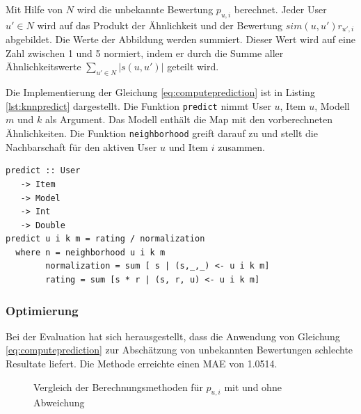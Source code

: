 \documentclass[a4paper, 12pt]{article}
\begin{document}
Mit Hilfe von $N$ wird die unbekannte Bewertung $p_{u,i}$ berechnet. Jeder User $u' \in N$ wird auf das Produkt der Ähnlichkeit und der Bewertung $sim(u,u') r_{u',i}$ abgebildet. Die Werte der Abbildung werden summiert. Dieser Wert wird auf eine Zahl zwischen 1 und 5 normiert, indem er durch die Summe aller Ähnlichkeitswerte $\sum_{u' \in N}{|s(u,u')|}$ geteilt wird. 

Die Implementierung der Gleichung \ref{eq:computeprediction} ist in Listing \ref{lst:knnpredict} dargestellt. Die Funktion \verb|predict| nimmt User $u$, Item $u$, Modell $m$ und $k$ als Argument. Das Modell enthält die Map mit den vorberechneten Ähnlichkeiten. Die Funktion \verb|neighborhood| greift darauf zu und stellt die Nachbarschaft für den aktiven User $u$ und Item $i$ zusammen.

\begin{lstlisting}[caption=Berechnung von $p_{u,i}$, label=lst:knnpredict]
  predict :: User
   -> Item
   -> Model
   -> Int
   -> Double
predict u i k m = rating / normalization
  where n = neighborhood u i k m
        normalization = sum [ s | (s,_,_) <- u i k m]
        rating = sum [s * r | (s, r, u) <- u i k m]
\end{lstlisting}

\subsubsection{Optimierung}
\label{sec:predict}

Bei der Evaluation hat sich herausgestellt, dass die Anwendung von Gleichung \ref{eq:computeprediction} zur Abschätzung von unbekannten Bewertungen schlechte Resultate liefert. Die Methode erreichte einen MAE von 1.0514. 

\begin{figure}
\centering
\caption{Vergleich der Berechnungsmethoden für $p_{u,i}$ mit und ohne Abweichung}
\label{fig:predicteq}
\end{figure}
\end{document}
